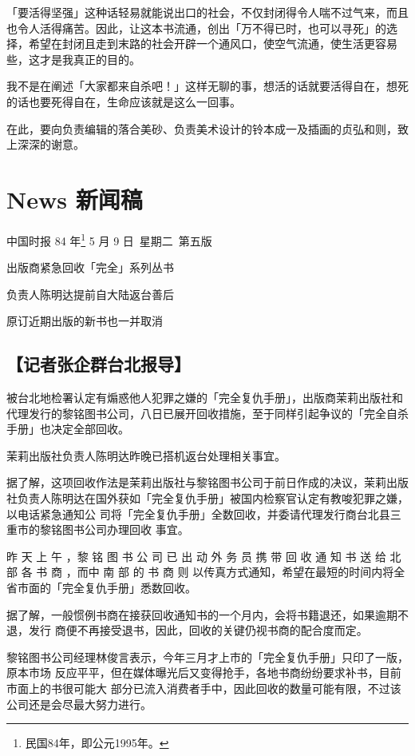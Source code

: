\documentclass[UTF8]{ctexart}
\begin{document}
「要活得坚强」这种话轻易就能说出口的社会，不仅封闭得令人喘不过气来，而且也令人活得痛苦。因此，让这本书流通，创出「万不得已时，也可以寻死」的选择，希望在封闭且走到末路的社会开辟一个通风口，使空气流通，使生活更容易些，这才是我真正的目的。

我不是在阐述「大家都来自杀吧！」这样无聊的事，想活的话就要活得自在，想死的话也要死得自在，生命应该就是这么一回事。

\newpage

在此，要向负责编辑的落合美砂、负责美术设计的铃本成一及插画的贞弘和则，致上深深的谢意。


\newpage

\section{News 新闻稿}

中国时报 84 年\footnote{民国84年，即公元1995年。} 5 月 9 日\ 星期二\ 第五版

出版商紧急回收「完全」系列丛书

负责人陈明达提前自大陆返台善后

原订近期出版的新书也一并取消

\subsection*{【记者张企群台北报导】}

被台北地检署认定有煽惑他人犯罪之嫌的「完全复仇手册」，出版商茉莉出版社和代理发行的黎铭图书公司，八日已展开回收措施，至于同样引起争议的「完全自杀手册」也决定全部回收。

茉莉出版社负责人陈明达昨晚已搭机返台处理相关事宜。

据了解，这项回收作法是茉莉出版社与黎铭图书公司于前日作成的决议，茉莉出版社负责人陈明达在国外获如「完全复仇手册」被国内检察官认定有教唆犯罪之嫌，以电话紧急通知公 司将「完全复仇手册」全数回收，并委请代理发行商台北县三重市的黎铭图书公司办理回收 事宜。

昨 天 上 午 ，黎 铭 图 书 公 司 已 出 动 外 务 员 携 带 回 收 通 知 书 送 给 北 部 各 书 商 ，而中 南 部 的 书 商 则 以传真方式通知，希望在最短的时间内将全省市面的「完全复仇手册」悉数回收。

据了解，一般惯例书商在接获回收通知书的一个月内，会将书籍退还，如果逾期不退，发行
商便不再接受退书，因此，回收的关键仍视书商的配合度而定。

黎铭图书公司经理林俊言表示，今年三月才上市的「完全复仇手册」只印了一版，原本市场
反应平平，但在媒体曝光后又变得抢手，各地书商纷纷要求补书，目前市面上的书很可能大
部分已流入消费者手中，因此回收的数量可能有限，不过该公司还是会尽最大努力进行。
\end{document}

